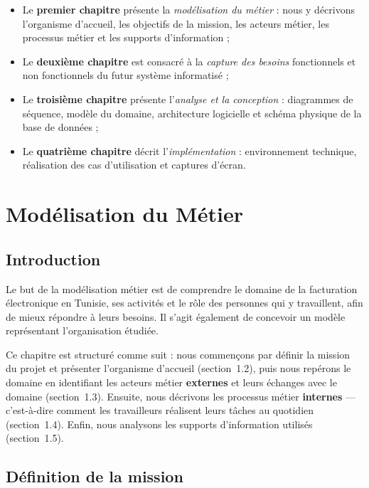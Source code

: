 \documentclass[a4paper,12pt]{report}
\begin{document}
\begin{itemize}[nosep]
    \item Le \textbf{premier chapitre} présente la \textit{modélisation du métier} : nous y décrivons l'organisme d'accueil, les objectifs de la mission, les acteurs métier, les processus métier et les supports d'information ;
    \item Le \textbf{deuxième chapitre} est consacré à la \textit{capture des besoins} fonctionnels et non fonctionnels du futur système informatisé ;
    \item Le \textbf{troisième chapitre} présente l'\textit{analyse et la conception} : diagrammes de séquence, modèle du domaine, architecture logicielle et schéma physique de la base de données ;
    \item Le \textbf{quatrième chapitre} décrit l'\textit{implémentation} : environnement technique, réalisation des cas d'utilisation et captures d'écran.
\end{itemize}


\chapter{Modélisation du Métier}

\section{Introduction}

Le but de la modélisation métier est de comprendre le domaine de la facturation électronique en Tunisie, ses activités et le rôle des personnes qui y travaillent, afin de mieux répondre à leurs besoins. Il s'agit également de concevoir un modèle représentant l'organisation étudiée.

Ce chapitre est structuré comme suit : nous commençons par définir la mission du projet et présenter l'organisme d'accueil (section~1.2), puis nous repérons le domaine en identifiant les acteurs métier \textbf{externes} et leurs échanges avec le domaine (section~1.3). Ensuite, nous décrivons les processus métier \textbf{internes} — c'est-à-dire comment les travailleurs réalisent leurs tâches au quotidien (section~1.4). Enfin, nous analysons les supports d'information utilisés (section~1.5).

\section{Définition de la mission}
\end{document}
